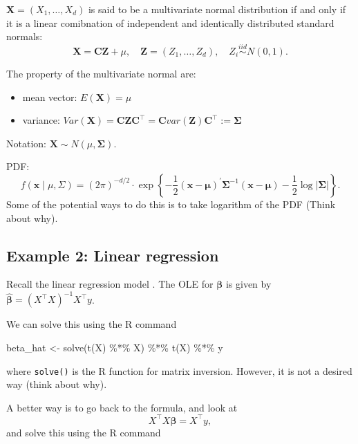 \documentclass[
  letterpaper,
  DIV=11,
  numbers=noendperiod]{scrreprt}
\newenvironment{Shaded}{\begin{snugshade}}{\end{snugshade}}
\newcommand{\FunctionTok}[1]{\textcolor[rgb]{0.28,0.35,0.67}{#1}}
\newcommand{\NormalTok}[1]{\textcolor[rgb]{0.00,0.23,0.31}{#1}}
\newcommand{\OtherTok}[1]{\textcolor[rgb]{0.00,0.23,0.31}{#1}}
\newcommand{\SpecialCharTok}[1]{\textcolor[rgb]{0.37,0.37,0.37}{#1}}
\providecommand{\tightlist}{%
  \setlength{\itemsep}{0pt}\setlength{\parskip}{0pt}}
\begin{document}
\(\boldsymbol{X} = (X_1,\dots, X_d)\) is said to be a multivariate
normal distribution if and only if it is a linear comibnation of
independent and identically distributed standard normals: \[
\boldsymbol{X} = \boldsymbol{CZ} + \mu,\quad \boldsymbol{Z}=(Z_1,\dots,Z_d),\quad Z_i \stackrel{iid}{\sim} N(0,1).
\]

The property of the multivariate normal are:

\begin{itemize}
\tightlist
\item
  mean vector: \(E(\boldsymbol{X}) = \mu\)
\item
  variance:
  \(Var(\boldsymbol{X}) = \boldsymbol{CZC}^\top = \boldsymbol{C} var(\boldsymbol{Z})\boldsymbol{C}^\top:=  \boldsymbol{\Sigma}\)
\end{itemize}

Notation: \(\boldsymbol{X} \sim N(\mu, \boldsymbol{\Sigma})\).

PDF: \[
f(\boldsymbol{x} \mid \mu, \Sigma)=(2 \pi)^{-d / 2} \cdot \exp \left\{-\frac{1}{2}(\boldsymbol{x}-\boldsymbol{\mu})^{\prime} \boldsymbol{\Sigma}^{-1}(\boldsymbol{x}-\boldsymbol{\mu})-\frac{1}{2} \log |\boldsymbol{\Sigma}|\right\}.
\] Some of the potential ways to do this is to take logarithm of the PDF
(Think about why).

\subsection{Example 2: Linear
regression}\label{example-2-linear-regression}

Recall the linear regression model . The OLE for \(\boldsymbol{\beta}\)
is given by \(\hat{\boldsymbol{\beta}}=(X^\top X)^{-1} X^\top y\).

We can solve this using the R command

\begin{Shaded}
\begin{Highlighting}[]
\NormalTok{beta\_hat }\OtherTok{\textless{}{-}} \FunctionTok{solve}\NormalTok{(}\FunctionTok{t}\NormalTok{(X) }\SpecialCharTok{\%*\%}\NormalTok{ X) }\SpecialCharTok{\%*\%} \FunctionTok{t}\NormalTok{(X) }\SpecialCharTok{\%*\%}\NormalTok{ y}
\end{Highlighting}
\end{Shaded}

where \texttt{solve()} is the R function for matrix inversion. However,
it is not a desired way (think about why).

A better way is to go back to the formula, and look at \[
X^\top X\boldsymbol{\beta}= X^\top y,
\] and solve this using the R command
\end{document}
